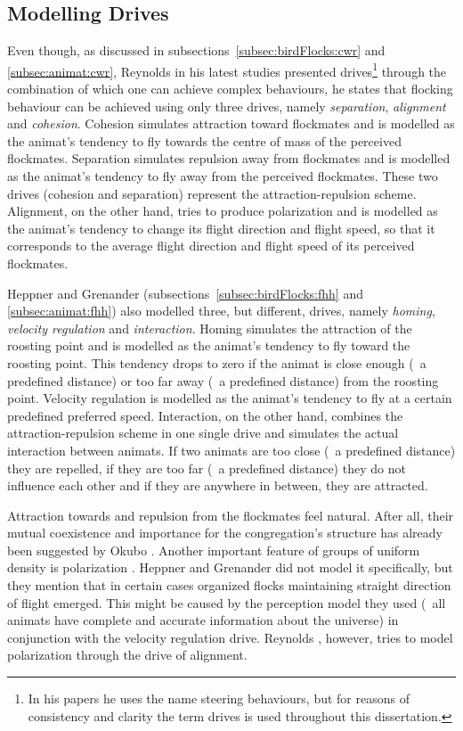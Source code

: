 \subsection{Modelling Drives}
Even though, as discussed in subsections~\ref{subsec:birdFlocks:cwr} and \ref{subsec:animat:cwr}, Reynolds in his latest studies \cite{reynolds:1999,reynolds:2000} presented drives\footnote{In his papers he uses the name steering behaviours, but for reasons of consistency and clarity the term drives is used throughout this dissertation.} through the combination of which one can achieve complex behaviours, he states that flocking behaviour can be achieved using only three drives, namely \emph{separation}, \emph{alignment} and \emph{cohesion}. Cohesion simulates attraction toward flockmates and is modelled as the animat's tendency to fly towards the centre of mass of the perceived flockmates. Separation simulates repulsion away from flockmates and is modelled as the animat's tendency to fly away from the perceived flockmates. These two drives (cohesion and separation) represent the attraction-repulsion scheme. Alignment, on the other hand, tries to produce polarization and is modelled as the animat's tendency to change its flight direction and flight speed, so that it corresponds to the average flight direction and flight speed of its perceived flockmates.

Heppner and Grenander \cite{heppner:1990} (subsections~\ref{subsec:birdFlocks:fhh} and \ref{subsec:animat:fhh}) also modelled three, but different, drives, namely \emph{homing}, \emph{velocity regulation} and \emph{interaction}. Homing simulates the attraction of the roosting point and is modelled as the animat's tendency to fly toward the roosting point. This tendency drops to zero if the animat is close enough (\ie\ a predefined distance) or too far away (\ie\ a predefined distance) from the roosting point. Velocity regulation is modelled as the animat's tendency to fly at a certain predefined preferred speed. Interaction, on the other hand, combines the attraction-repulsion scheme in one single drive and simulates the actual interaction between animats. If two animats are too close (\ie\ a predefined distance) they are repelled, if they are too far (\ie\ a predefined distance) they do not influence each other and if they are anywhere in between, they are attracted.

Attraction towards and repulsion from the flockmates feel natural. After all, their mutual coexistence and importance for the congregation's structure has already been suggested by Okubo \cite{okubo:1980}. Another important feature of groups of uniform density is polarization \cite{parrish:1997a}. Heppner and Grenander \cite{heppner:1990} did not model it specifically, but they mention that in certain cases organized flocks maintaining straight direction of flight emerged. This might be caused by the perception model they used (\ie\ all animats have complete and accurate information about the universe) in conjunction with the velocity regulation drive. Reynolds \cite{reynolds:1987}, however, tries to model polarization through the drive of alignment.

